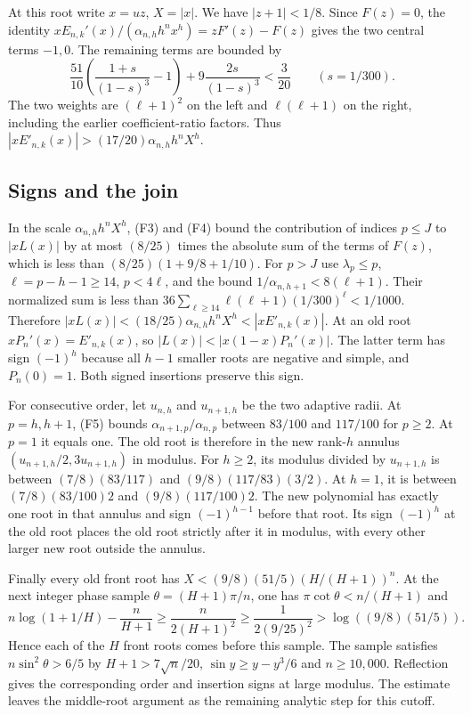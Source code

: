 At this root write $x=uz$, $X=|x|$. We have $|z+1|<1/8$. Since $F(z)=0$, the identity $xE_{n,k}'(x)/(\alpha_{n,h}h^n x^h)=zF'(z)-F(z)$ gives the two central terms $-1,0$. The remaining terms are bounded by
\[
\frac{51}{10}\left(\frac{1+s}{(1-s)^3}-1\right)
  +9\frac{2s}{(1-s)^3}<\frac3{20}\qquad(s=1/300).
\]
The two weights are $(\ell+1)^2$ on the left and $\ell(\ell+1)$ on the right, including the earlier coefficient-ratio factors. Thus $|xE'_{n,k}(x)|>(17/20)\alpha_{n,h}h^nX^h$.

\subsection{Signs and the join}

In the scale $\alpha_{n,h}h^n X^h$, (F3) and (F4) bound the contribution of indices $p\le J$ to $|xL(x)|$ by at most $(8/25)$ times the absolute sum of the terms of $F(z)$, which is less than $(8/25)(1+9/8+1/10)$. For $p>J$ use $\lambda_p\le p$, $\ell=p-h-1\ge14$, $p<4\ell$, and the bound $1/\alpha_{n,h+1}<8(\ell+1)$. Their normalized sum is less than $36\sum_{\ell\ge14}\ell(\ell+1)(1/300)^\ell<1/1000$. Therefore $|xL(x)|<(18/25)\alpha_{n,h}h^nX^h<|xE'_{n,k}(x)|$. At an old root $xP_n'(x)=E'_{n,k}(x)$, so $|L(x)|<|x(1-x)P_n'(x)|$. The latter term has sign $(-1)^h$ because all $h-1$ smaller roots are negative and simple, and $P_n(0)=1$. Both signed insertions preserve this sign.

For consecutive order, let $u_{n,h}$ and $u_{n+1,h}$ be the two adaptive radii. At $p=h,h+1$, (F5) bounds $\alpha_{n+1,p}/\alpha_{n,p}$ between $83/100$ and $117/100$ for $p\ge2$. At $p=1$ it equals one. The old root is therefore in the new rank-$h$ annulus $(u_{n+1,h}/2,3u_{n+1,h})$ in modulus. For $h\ge2$, its modulus divided by $u_{n+1,h}$ is between $(7/8)(83/117)$ and $(9/8)(117/83)(3/2)$. At $h=1$, it is between $(7/8)(83/100)2$ and $(9/8)(117/100)2$. The new polynomial has exactly one root in that annulus and sign $(-1)^{h-1}$ before that root. Its sign $(-1)^h$ at the old root places the old root strictly after it in modulus, with every other larger new root outside the annulus.

Finally every old front root has $X<(9/8)(51/5)(H/(H+1))^n$. At the next integer phase sample $\theta=(H+1)\pi/n$, one has $\pi\cot\theta<n/(H+1)$ and
\[
n\log(1+1/H)-\frac n{H+1}
\ge\frac n{2(H+1)^2}
\ge\frac1{2(9/25)^2}
>\log((9/8)(51/5)).
\]
Hence each of the $H$ front roots comes before this sample. The sample satisfies $n\sin^2\theta>6/5$ by $H+1>7\sqrt n/20$, $\sin y\ge y-y^3/6$ and $n\ge10{,}000$. Reflection gives the corresponding order and insertion signs at large modulus. The estimate leaves the middle-root argument as the remaining analytic step for this cutoff.

